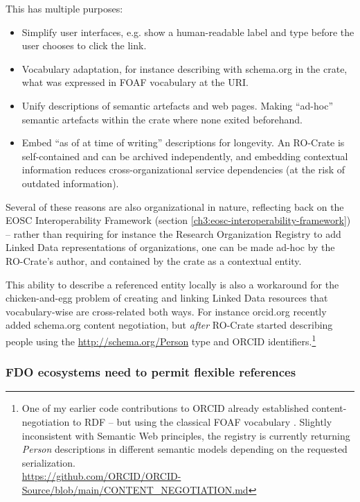 This has multiple purposes:

\begin{itemize}
    \item Simplify user interfaces, e.g. show a human-readable label and type before the user chooses to click the link.
    \item Vocabulary adaptation, for instance describing with schema.org in the crate, what was expressed in FOAF vocabulary at the URI.
    \item Unify descriptions of semantic artefacts and web pages. 
          Making ``ad-hoc'' semantic artefacts within the crate where none exited beforehand.
    \item Embed ``as of at time of writing'' descriptions for longevity. 
          An RO-Crate is self-contained and can be archived independently, and embedding contextual information reduces cross-organizational service dependencies (at the risk of outdated information).
\end{itemize}

Several of these reasons are also organizational in nature, reflecting back on the EOSC Interoperability Framework (section \vref{ch3:eosc-interoperability-framework}) -- rather than requiring for instance the Research Organization Registry  to add Linked Data representations of organizations, one can be made ad-hoc by the RO-Crate's author, and contained by the crate as a contextual entity. 

This ability to describe a referenced entity locally is also a workaround for the chicken-and-egg problem of creating and linking Linked Data resources that vocabulary-wise are cross-related both ways. For instance orcid.org recently added schema.org content negotiation, but \emph{after} RO-Crate started describing people using the \url{http://schema.org/Person} type and ORCID identifiers.\footnote{
  One of my earlier code contributions to ORCID already established content-negotiation to RDF -- but using the classical FOAF vocabulary \cite{FOAFVocabularySpecification}.
  Slightly inconsistent with Semantic Web principles, the registry is currently returning \emph{Person} descriptions in different semantic models depending on the requested serialization. \\
  \url{https://github.com/ORCID/ORCID-Source/blob/main/CONTENT_NEGOTIATION.md}} 


\subsubsection{FDO ecosystems need to permit flexible references}
\label{ch61:references}

